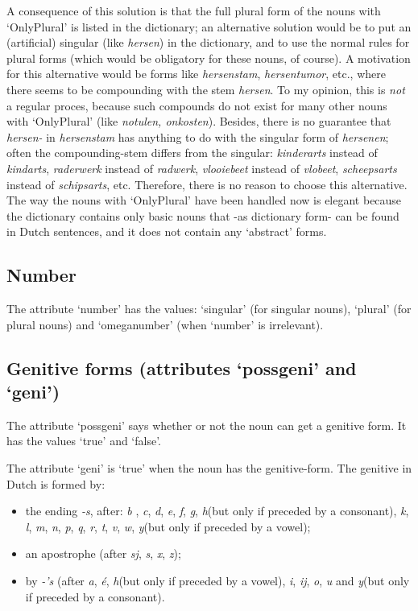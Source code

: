 A consequence of this solution is that the full plural form of the 
nouns with `OnlyPlural' is listed in 
the dictionary; an alternative solution would be to put an (artificial) 
singular (like {\em hersen}) in the dictionary, and to use the normal rules for
plural forms (which would be obligatory for these nouns, of course). A 
motivation for this alternative would be forms like {\em hersenstam}, 
{\em hersentumor}, etc., where there seems to be compounding with the stem 
{\em hersen}. To my opinion, this is {\em not} a regular proces, because such
compounds do not exist for many other nouns with `OnlyPlural' (like {\em 
notulen, onkosten}). Besides, there is no guarantee that {\em hersen-} in 
{\em hersenstam} has anything to do with the singular form of {\em hersenen}; 
often the compounding-stem differs from the singular: {\em kinderarts} instead 
of {\em kindarts}, {\em raderwerk} instead of {\em radwerk}, {\em vlooiebeet}
instead of {\em vlobeet}, {\em scheepsarts} instead of {\em schipsarts}, etc.
Therefore, there is no reason to choose this alternative. The way the nouns
with `OnlyPlural' have been handled now is elegant because the dictionary 
contains only basic nouns that -as dictionary form- can be found in Dutch 
sentences, and it does not contain any `abstract' forms.





\subsection{Number}

The attribute `number' has the values: `singular' (for singular nouns), 
`plural' (for plural nouns) and `omeganumber' (when `number' is irrelevant).


\subsection{Genitive forms (attributes `possgeni' and `geni')}

The attribute `possgeni' says whether or not the noun can get a genitive form.
It has the values `true' and `false'.

The attribute `geni' is `true' when the noun has the genitive-form. The 
genitive in Dutch is formed by:
\begin{itemize}
  \item the ending {\em -s}, after: {\em b} , {\em c}, {\em d}, {\em e},
        {\em f}, {\em g}, {\em h}(but only if preceded by a consonant), 
        {\em k}, {\em l}, {\em m}, {\em n}, {\em p}, {\em q}, {\em r}, {\em t}, 
        {\em v}, {\em w}, {\em y}(but only if preceded by a vowel);
  \item an apostrophe (after {\em sj}, {\em s}, {\em x}, {\em z});
  \item by {\em -'s} (after {\em a}, {\em \'{e}}, {\em h}(but only if preceded 
        by a vowel), {\em i}, {\em ij}, {\em o}, {\em u} and 
        {\em y}(but only if preceded by a consonant).
\end{itemize}

